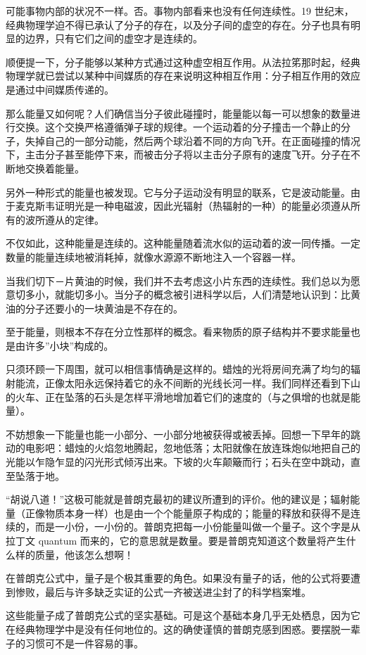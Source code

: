 可能事物内部的状况不一样。否。事物内部看来也没有任何连续性。19 世纪末，经典物理学迫不得已承认了分子的存在，以及分子间的虚空的存在。分子也具有明显的边界，只有它们之间的虚空才是连续的。

顺便提一下，分子能够以某种方式通过这种虚空相互作用。从法拉笫那时起，经典物理学就已尝试以某种中间媒质的存在来说明这种相互作用：分子相互作用的效应是通过中间媒质传递的。

那么能量又如何呢？人们确信当分子彼此碰撞时，能量能以每一可以想象的数量进行交换。这个交换严格遵循弹子球的规律。一个运动着的分子撞击一个静止的分子，失掉自己的一部分动能，然后两个球沿着不同的方向飞开。在正面碰撞的情况下，主击分子甚至能停下来，而被击分子将以主击分子原有的速度飞开。分子在不断地交换着能量。

另外一种形式的能量也被发现。它与分子运动没有明显的联系，它是波动能量。由于麦克斯韦证明光是一种电磁波，因此光辐射（热辐射的一种）的能量必须遵从所有的波所遵从的定律。

不仅如此，这种能量是连续的。这种能量随着流水似的运动着的波一同传播。一定数量的能量连续地被消耗掉，就像水源源不断地注入一个容器一样。

当我们切下－片黄油的时候，我们并不去考虑这小片东西的连续性。我们总以为愿意切多小，就能切多小。当分子的概念被引进科学以后，人们清楚地认识到：比黄油的分子还要小的一块黄油是不存在的。

至于能量，则根本不存在分立性那样的概念。看来物质的原子结构并不要求能量也是由许多”小块”构成的。

只须环顾一下周围，就可以相信事情确是这样的。蜡烛的光将房间充满了均匀的辐射能流，正像太阳永远保持着它的永不间断的光线长河一样。我们同样还看到下山的火车、正在坠落的石头是怎样平滑地增加着它们的速度的（与之俱增的也就是能量）。

不妨想象一下能量也能一小部分、一小部分地被获得或被丢掉。回想一下早年的跳动的电影吧：蜡烛的火焰忽地腾起，忽地低落；太阳就像在放连珠炮似地把自己的光能以乍隐乍显的闪光形式倾泻出来。下坡的火车颠簸而行；石头在空中跳动，直至坠落于地。

“胡说八道！”这极可能就是普朗克最初的建议所遭到的评价。他的建议是；辐射能量（正像物质本身一样）也是由一个个能量原子构成的；能量的释放和获得不是连续的，而是一小份，一小份的。普朗克把每一小份能量叫做一个量子。这个字是从拉丁文 quantum 而来的，它的意思就是数量。要是普朗克知道这个数量将产生什么样的质量，他该怎么想啊！

在普朗克公式中，量子是个极其重要的角色。如果没有量子的话，他的公式将要遭到惨败，最后与许多缺乏实证的公式一齐被送进尘封了的科学档案堆。

这些能量子成了普朗克公式的坚实基础。可是这个基础本身几乎无处栖息，因为它在经典物理学中是没有任何地位的。这的确使谨慎的普朗克感到困惑。要摆脱一辈子的习惯可不是一件容易的事。

